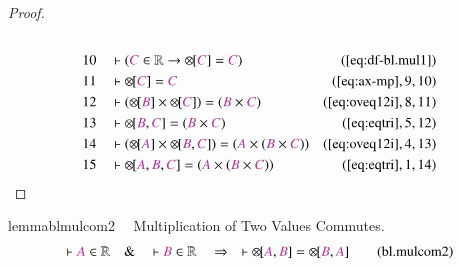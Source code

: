 \begin{proof}
\begin{align}
  \\ 10 &&  & \vdash ( \mc{C} \in \mathbb{R} \rightarrow
      {\otimes\hspace{-1pt}[} \mc{C} ] = \mc{C}
      )&(\mbox{\ref{eq:df-bl.mul1}})\notag
  \\ 11 &&  & \vdash {\otimes\hspace{-1pt}[} \mc{C} ] =
      \mc{C}&(\mbox{\ref{eq:ax-mp}},9,10)\notag
  \\ 12 &&  & \vdash ( {\otimes\hspace{-1pt}[} \mc{B} ] \times
      {\otimes\hspace{-1pt}[} \mc{C} ] ) = ( \mc{B} \times
      \mc{C} )&(\mbox{\ref{eq:oveq12i}},8,11)\notag
  \\ 13 &&  & \vdash {\otimes\hspace{-1pt}[} \mc{B} , \mc{C} ] = ( \mc{B} \times
      \mc{C} )&(\mbox{\ref{eq:eqtri}},5,12)\notag
  \\ 14 &&  & \vdash ( {\otimes\hspace{-1pt}[} \mc{A} ] \times
      {\otimes\hspace{-1pt}[} \mc{B} , \mc{C} ] ) = (
      \mc{A} \times ( \mc{B} \times \mc{C} )
      )&(\mbox{\ref{eq:oveq12i}},4,13)\notag
  \\ 15 &&  & \vdash {\otimes\hspace{-1pt}[} \mc{A} , \mc{B} , \mc{C} ] = (
      \mc{A} \times ( \mc{B} \times \mc{C} )
      )&(\mbox{\ref{eq:eqtri}},1,14)\notag
\end{align}
\end{proof}

\begin{restatable}{lemma}{blmulcom2}~~ Multiplication of Two Values Commutes.
\begin{align}
\vdash \mc{A} \in \mathbb{R}\quad\&\quad \vdash \mc{B} \in
    \mathbb{R}\quad\Rightarrow\quad \vdash {\otimes\hspace{-1pt}[} \mc{A} ,
    \mc{B} ] = {\otimes\hspace{-1pt}[} \mc{B} , \mc{A}
    ]\label{eq:bl.mulcom2}\tag{bl.mulcom2}
\end{align}
\end{restatable}

